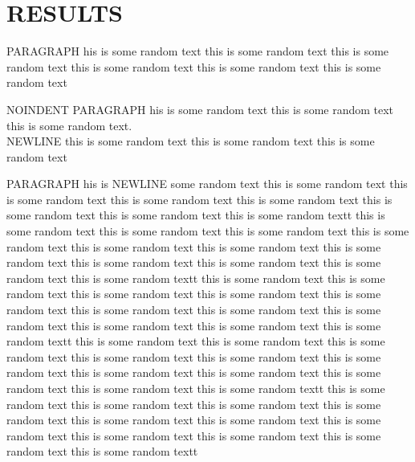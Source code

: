 \section{RESULTS}
\par PARAGRAPH his is some random text
this is some random text
this is some random text
this is some random text
this is some random text
this is some random text
\par\noindent NOINDENT PARAGRAPH his is some random text
this is some random text
this is some random text.\\NEWLINE this is some random text
this is some random text
this is some random text
\par PARAGRAPH his is \newline NEWLINE some random text
this is some random text
this is some random text
this is some random text
this is some random text
this is some random text
this is some random text
this is some random textt
this is some random text
this is some random text
this is some random text
this is some random text
this is some random text
this is some random text
this is some random text
this is some random text
this is some random text
this is some random text
this is some random textt
this is some random text
this is some random text
this is some random text
this is some random text
this is some random text
this is some random text
this is some random text
this is some random text
this is some random text
this is some random text
this is some random textt
this is some random text
this is some random text
this is some random text
this is some random text
this is some random text
this is some random text
this is some random text
this is some random text
this is some random text
this is some random text
this is some random textt
this is some random text
this is some random text
this is some random text
this is some random text
this is some random text
this is some random text
this is some random text
this is some random text
this is some random text
this is some random text
this is some random textt
